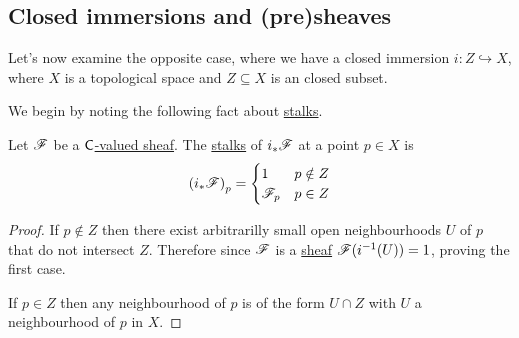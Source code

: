 \documentclass[../../main]{subfiles}
\begin{document}
\subsection{Closed immersions and (pre)sheaves}

Let's now examine the opposite case, where we have a closed immersion \(i\colon Z \hookrightarrow X\), where \(X\) is a topological space and \(Z \subseteq X\) is an closed subset.


We begin by noting the following fact about \hyperref[def:stalk]{stalks}.
\begin{lemma}\label{lemma:stalk-closed-immersion}
  Let \(\mathscr{F}\) be a \hyperref[def:sheaf]{\(\mathsf{C}\)-valued sheaf}.
  The \hyperref[def:stalk]{stalks} of \(i_{\ast}\mathscr{F}\) at a point \(p \in X\) is
  \begin{equation*}
    \left( i_{\ast}\mathscr{F} \right)_{p} = \begin{cases}
      1 & p \notin Z \\
      \mathscr{F}_{p} & p \in Z
    \end{cases}
  \end{equation*}
\end{lemma}
\begin{proof}
  If \(p \notin Z\) then there exist arbitrarilly small open neighbourhoods \(U\) of \(p\) that do not intersect \(Z\).
  Therefore since \(\mathscr{F}\) is a \hyperref[def:sheaf]{sheaf} \(\mathscr{F}(i^{-1}(U)) = 1\), proving the first case.

  If \(p \in Z\) then any neighbourhood of \(p\) is of the form \(U \cap Z\) with \(U\) a neighbourhood of \(p\) in \(X\).
\end{proof}
\end{document}
